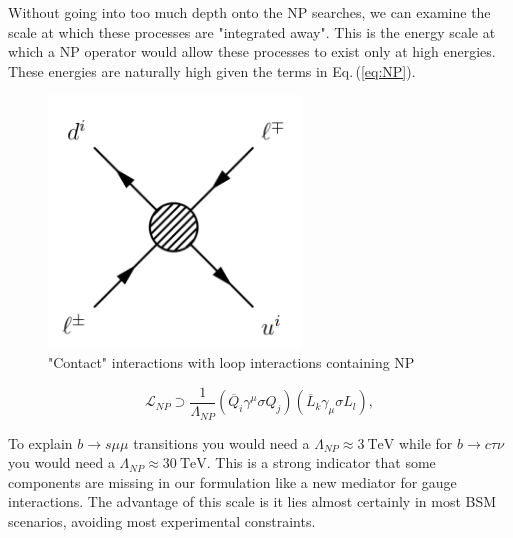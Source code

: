 \documentclass[10pt]{book}
\renewcommand{\(}{\left(}
\renewcommand{\)}{\right)}
\renewcommand{\[}{\left[}
\renewcommand{\]}{\right]}
\begin{document}
Without going into too much depth onto the NP searches, we can examine the scale at which these processes are "integrated away". 
%
This is the energy scale at which a NP operator would allow these processes to exist only at high energies. These energies are naturally high given the terms in Eq.\,(\ref{eq:NP}). 
%
\bigbreak
%
\noindent\begin{minipage}{.35\textwidth}
	\begin{figure}[H]
		\label{fig:contactNP}
		\centering
		\includegraphics[width=0.6\textwidth]{My_First_Diagram.png}
		\caption{"Contact" interactions with loop interactions containing NP}
	\end{figure}
\end{minipage}
\begin{minipage}{.6\textwidth}
\begin{equation}
\label{eq:NP}
\mathcal{L}_{NP} \supset \frac{1}{\Lambda_{NP}} (\overline{Q}_i \gamma^\mu \sigma Q_j ) (\overline{L}_k \gamma_\mu \sigma L_l) ,  
\end{equation}
\end{minipage}
%
\bigbreak
%
To explain $b \rightarrow s \mu \mu$ transitions you would need a $\Lambda_{NP} \approx 3 \ \text{TeV}$ while for $b \rightarrow c \tau \nu$ you would need a $\Lambda_{NP} \approx 30\ \text{TeV}$. This is a strong indicator that some components are missing in our formulation like a new mediator for gauge interactions. The advantage of this scale is it lies almost certainly in most BSM scenarios, avoiding most experimental constraints.
\end{document}
